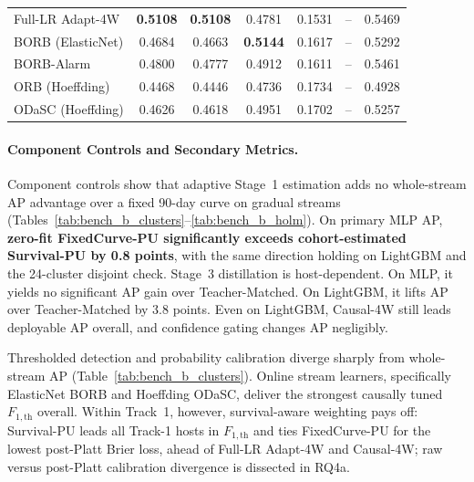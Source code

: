\documentclass[pdflatex,sn-basic]{sn-jnl}
\theoremstyle{definition}
\theoremstyle{plain}
\begin{document}
\begin{table}[t]
\begin{tabular*}{\textwidth}{@{\extracolsep\fill}lcccccc@{}}
Full-LR Adapt-4W & \textbf{0.5108} & \textbf{0.5108} & 0.4781 & 0.1531 & -- & 0.5469 \\
BORB (ElasticNet) & 0.4684 & 0.4663 & \textbf{0.5144} & 0.1617 & -- & 0.5292 \\
BORB-Alarm & 0.4800 & 0.4777 & 0.4912 & 0.1611 & -- & 0.5461 \\
ORB (Hoeffding) & 0.4468 & 0.4446 & 0.4736 & 0.1734 & -- & 0.4928 \\
ODaSC (Hoeffding) & 0.4626 & 0.4618 & 0.4951 & 0.1702 & -- & 0.5257 \\
\bottomrule
\end{tabular*}
\vspace{2pt}\par{}
\end{table}

\paragraph{Component Controls and Secondary Metrics.}
Component controls show that adaptive Stage~1 estimation adds no whole-stream AP advantage over a fixed 90-day curve on gradual streams (Tables~\ref{tab:bench_b_clusters}--\ref{tab:bench_b_holm}). On primary MLP AP, \textbf{zero-fit FixedCurve-PU significantly exceeds cohort-estimated Survival-PU by 0.8 points}, with the same direction holding on LightGBM and the 24-cluster disjoint check. Stage~3 distillation is host-dependent. On MLP, it yields no significant AP gain over Teacher-Matched. On LightGBM, it lifts AP over Teacher-Matched by 3.8 points. Even on LightGBM, Causal-4W still leads deployable AP overall, and confidence gating changes AP negligibly.

Thresholded detection and probability calibration diverge sharply from whole-stream AP (Table~\ref{tab:bench_b_clusters}). Online stream learners, specifically ElasticNet BORB and Hoeffding ODaSC, deliver the strongest causally tuned $F_{1,\text{th}}$ overall. Within Track~1, however, survival-aware weighting pays off: Survival-PU leads all Track-1 hosts in $F_{1,\text{th}}$ and ties FixedCurve-PU for the lowest post-Platt Brier loss, ahead of Full-LR Adapt-4W and Causal-4W; raw versus post-Platt calibration divergence is dissected in RQ4a.
\end{document}
